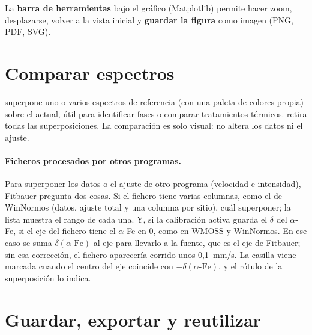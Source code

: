 La \textbf{barra de herramientas} bajo el gráfico (Matplotlib) permite hacer
zoom, desplazarse, volver a la vista inicial y \textbf{guardar la figura} como
imagen (PNG, PDF, SVG).


\section{Comparar espectros}
\label{sec:comparar}

 superpone uno o varios espectros de
referencia (con una paleta de colores propia) sobre el actual, útil para
identificar fases o comparar tratamientos térmicos.  retira todas las superposiciones. La comparación es solo visual: no
altera los datos ni el ajuste.

\paragraph{Ficheros procesados por otros programas.} Para superponer los datos o
el ajuste de otro programa (velocidad e intensidad), Fitbauer pregunta dos cosas.
Si el fichero tiene varias columnas, como el de WinNormos (datos, ajuste total y
una columna por sitio), cuál superponer; la lista muestra el rango de cada una.
Y, si la calibración activa guarda el $\delta$ del $\alpha$-Fe, si el eje del
fichero tiene el $\alpha$-Fe en 0, como en WMOSS y WinNormos. En ese caso se
suma $\delta(\alpha\text{-Fe})$ al eje para llevarlo a la fuente, que es el eje
de Fitbauer; sin esa corrección, el fichero aparecería corrido unos 0{,}1~mm/s.
La casilla viene marcada cuando el centro del eje coincide con
$-\delta(\alpha\text{-Fe})$, y el rótulo de la superposición lo indica.

\section{Guardar, exportar y reutilizar}

